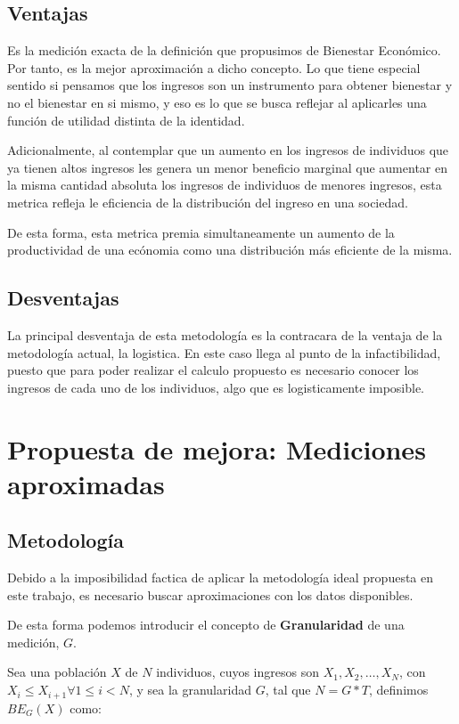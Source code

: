 \subsection{Ventajas}

Es la medición exacta de la definición que propusimos de Bienestar Económico. Por tanto, es la mejor aproximación a dicho concepto. Lo que tiene especial sentido si pensamos que los ingresos son un instrumento para obtener bienestar y no el bienestar en si mismo, y eso es lo que se busca reflejar al aplicarles una función de utilidad distinta de la identidad.


Adicionalmente, al contemplar que un aumento en los ingresos de individuos que ya tienen altos ingresos les genera un menor beneficio marginal que aumentar en la misma cantidad absoluta los ingresos de individuos de menores ingresos, esta metrica refleja le eficiencia de la distribución del ingreso en una sociedad.

De esta forma, esta metrica premia simultaneamente un aumento de la productividad de una ecónomia como una distribución más eficiente de la misma.

\subsection{Desventajas}

La principal desventaja de esta metodología es la contracara de la ventaja de la metodología actual, la logistica. En este caso llega al punto de la infactibilidad, puesto que para poder realizar el calculo propuesto es necesario conocer los ingresos de cada uno de los individuos, algo que es logisticamente imposible.

\section{Propuesta de mejora: Mediciones aproximadas}

\subsection{Metodología}

Debido a la imposibilidad factica de aplicar la metodología ideal propuesta en este trabajo, es necesario buscar aproximaciones con los datos disponibles.

De esta forma podemos introducir el concepto de \textbf{Granularidad} de una medición, $G$.

Sea una población $X$ de $N$ individuos, cuyos ingresos son $X_1, X_2, \dots, X_N $, con $X_i \leq X_{i+1} \forall 1 \leq i < N$, y sea la granularidad $G$, tal que $N = G * T$, definimos $BE_G(X)$ como:

